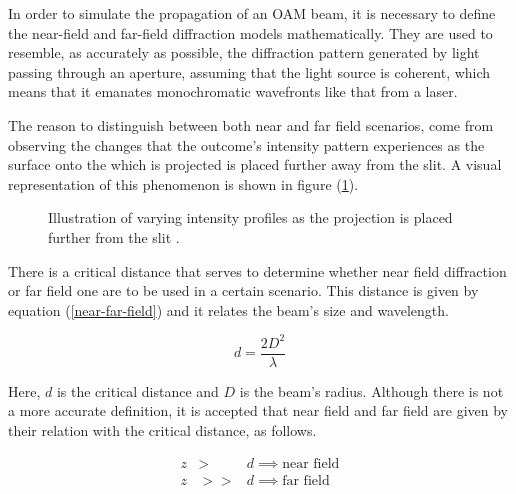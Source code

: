 In order to simulate the propagation of an OAM beam, it is necessary to define the near-field and far-field diffraction models mathematically. They are used to resemble, as accurately as possible, the diffraction pattern generated by light passing through an aperture, assuming that the light source is coherent, which means that it emanates monochromatic wavefronts like that from a laser. 

The reason to distinguish between both near and far field scenarios, come from observing the changes that the outcome's intensity pattern experiences as the surface onto the which is projected is placed further away from the slit. A visual representation of this phenomenon is shown in figure (\ref{fig:Diffraction-Distinction}).

\begin{figure}[htbp]
    \centering
    \caption{Illustration of varying intensity profiles as the projection is placed further from the slit \protect\cite{Near-Far_Field_Diff}.}
    \label{fig:Diffraction-Distinction}
\end{figure}

There is a critical distance that serves to determine whether near field diffraction or far field one are to be used in a certain scenario. This distance is given by equation (\ref{near-far-field}) and it relates the beam's size and wavelength.

\begin{equation}
    d = \frac{2D^2}{\lambda}
    \label{near-far-field}
\end{equation}

Here, $d$ is the critical distance and $D$ is the beam's radius. Although there is not a more accurate definition, it is accepted that near field and far field are given by their relation with the critical distance, as follows.

\begin{eqnarray}
    z &>& d \implies \textrm{near field}\\
    z &>>& d \implies \textrm{far field}
\end{eqnarray}

